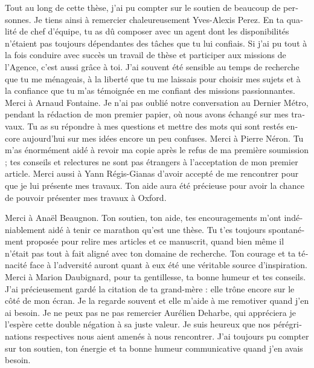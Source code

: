 \begin{otherlanguage}{french}
  Tout au long de cette thèse, j’ai pu compter sur le soutien de beaucoup de
  personnes. Je tiens ainsi à remercier chaleureusement Yves-Alexis Perez. En ta
  qualité de chef d’équipe, tu as dû composer avec un agent dont les
  disponibilités n’étaient pas toujours dépendantes des tâches que tu lui
  confiais. Si j’ai pu tout à la fois conduire avec succès un travail de thèse
  et participer aux missions de l’Agence, c’est aussi grâce à toi. J’ai souvent
  été sensible au temps de recherche que tu me ménageais, à la liberté que tu me
  laissais pour choisir mes sujets et à la confiance que tu m’as témoignée en me
  confiant des missions passionnantes.
  Merci à Arnaud Fontaine. Je n’ai pas oublié notre conversation au Dernier
  Métro, pendant la rédaction de mon premier papier, où nous avons échangé sur
  mes travaux. Tu as su répondre à mes questions et mettre des mots qui sont
  restés encore aujourd’hui sur mes idées encore un peu confuses.
  Merci à Pierre Néron. Tu m’as énormément aidé à revoir ma copie après le refus
  de ma première soumission ; tes conseils et relectures ne sont pas étrangers à
  l’acceptation de mon premier article.
  Merci aussi à Yann Régis-Gianas d’avoir accepté de me rencontrer pour que je
  lui présente mes travaux. Ton aide aura été précieuse pour avoir la chance de
  pouvoir présenter mes travaux à Oxford.

  Merci à Anaël Beaugnon. Ton soutien, ton aide, tes encouragements m’ont
  indéniablement aidé à tenir ce marathon qu'est une thèse. Tu t’es toujours
  spontanément proposée pour relire mes articles et ce manuscrit, quand bien
  même il n’était pas tout à fait aligné avec ton domaine de recherche. Ton
  courage et ta ténacité face à l’adversité auront quant à eux été une véritable
  source d’inspiration.
  Merci à Marion Daubignard, pour ta gentillesse, ta bonne humeur et tes
  conseils. J’ai précieusement gardé la citation de ta grand-mère : elle trône
  encore sur le côté de mon écran. Je la regarde souvent et elle m’aide à me
  remotiver quand j’en ai besoin.
  Je ne peux pas ne pas remercier Aurélien Deharbe, qui appréciera je l’espère
  cette double négation à sa juste valeur. Je suis heureux que nos
  pérégrinations respectives nous aient amenés à nous rencontrer. J’ai toujours
  pu compter sur ton soutien, ton énergie et ta bonne humeur communicative quand
  j’en avais besoin.


\end{otherlanguage}

